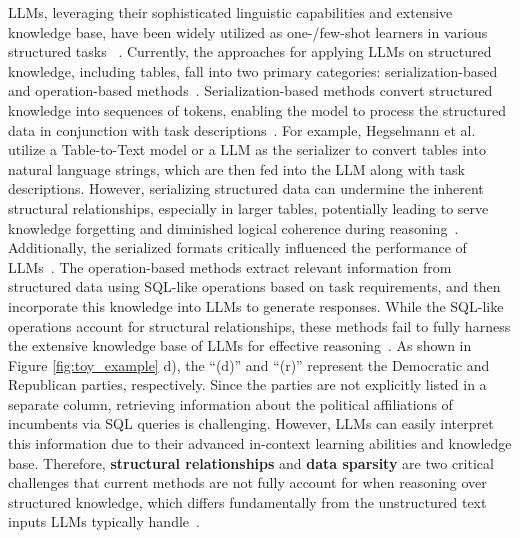 LLMs, leveraging their sophisticated linguistic capabilities and extensive knowledge base, have been widely utilized as one-/few-shot learners in various structured tasks ~\cite{hegselmann2023tabllm,hanlarge,zhu2023incorporating,kongopentab}. Currently, the approaches for applying LLMs on structured knowledge, including tables, fall into two primary categories: serialization-based~\cite{min2024exploring,hegselmann2023tabllm,jaitly2023towards} and operation-based methods~\cite{ye2023decomposers,jiang-etal-2023-structgpt,wang2024chainoftable,lu2023chameleon}. Serialization-based methods convert structured knowledge into sequences of tokens, enabling the model to process the structured data in conjunction with task descriptions~\cite{min2024exploring,shao2024linearizing}. For example, Hegselmann et al.~\cite{hegselmann2023tabllm} utilize a Table-to-Text model or a LLM as the serializer to convert tables into natural language strings, which are then fed into the LLM along with task descriptions. However, serializing structured data can undermine the inherent structural relationships, especially in larger tables, potentially leading to serve knowledge forgetting and diminished logical coherence during reasoning~\cite{zhang2023ho,li2024snapkv}. Additionally, the serialized formats critically influenced the performance of LLMs~\cite{singha2023tabular}. The operation-based methods extract relevant information from structured data using SQL-like operations based on task requirements, and then incorporate this knowledge into LLMs to generate responses. While the SQL-like operations account for structural relationships, these methods fail to fully harness the extensive knowledge base of LLMs for effective reasoning~\cite{zhu2023incorporating}. As shown in Figure \ref{fig:toy_example} d), the ``(d)'' and ``(r)'' represent the Democratic and Republican parties, respectively. Since the parties are not explicitly listed in a separate column, retrieving information about the political affiliations of incumbents via SQL queries is challenging. However, LLMs can easily interpret this information due to their advanced in-context learning abilities and knowledge base. Therefore, \textbf{structural relationships} and \textbf{data sparsity} are two critical challenges that current methods are not fully account for when reasoning over structured knowledge, which differs fundamentally from the unstructured text inputs LLMs typically handle~\cite{fang2024large}. 

